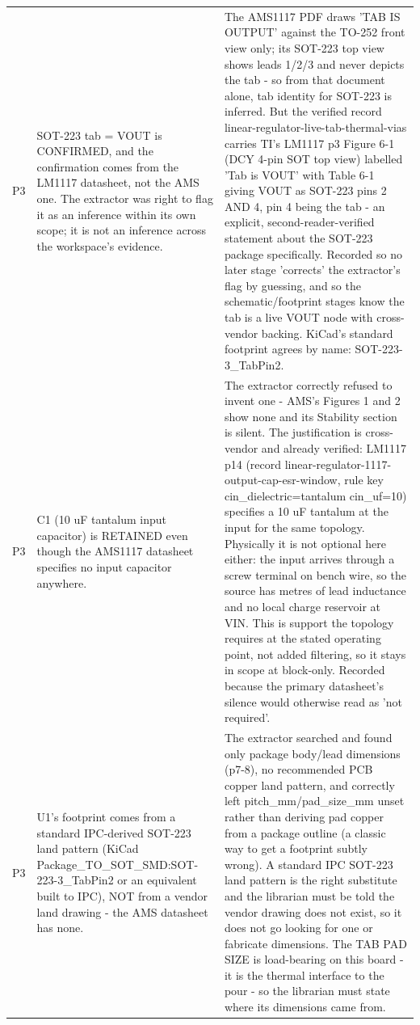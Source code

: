 \documentclass[11pt,a4paper]{article}
\begin{document}
{\begin{longtable}{lp{5.2cm}p{7.2cm}}
P3 & SOT-223 tab = VOUT is CONFIRMED, and the confirmation comes from the LM1117 datasheet, not the AMS one. The extractor was right to flag it as an inference within its own scope; it is not an inference across the workspace's evidence. & The AMS1117 PDF draws 'TAB IS OUTPUT' against the TO-252 front view only; its SOT-223 top view shows leads 1/2/3 and never depicts the tab - so from that document alone, tab identity for SOT-223 is inferred. But the verified record linear-regulator-live-tab-thermal-vias carries TI's LM1117 p3 Figure 6-1 (DCY 4-pin SOT top view) labelled 'Tab is VOUT' with Table 6-1 giving VOUT as SOT-223 pins 2 AND 4, pin 4 being the tab - an explicit, second-reader-verified statement about the SOT-223 package specifically. Recorded so no later stage 'corrects' the extractor's flag by guessing, and so the schematic/footprint stages know the tab is a live VOUT node with cross-vendor backing. KiCad's standard footprint agrees by name: SOT-223-3\_TabPin2. \\
P3 & C1 (10 uF tantalum input capacitor) is RETAINED even though the AMS1117 datasheet specifies no input capacitor anywhere. & The extractor correctly refused to invent one - AMS's Figures 1 and 2 show none and its Stability section is silent. The justification is cross-vendor and already verified: LM1117 p14 (record linear-regulator-1117-output-cap-esr-window, rule key cin\_dielectric=tantalum cin\_uf=10) specifies a 10 uF tantalum at the input for the same topology. Physically it is not optional here either: the input arrives through a screw terminal on bench wire, so the source has metres of lead inductance and no local charge reservoir at VIN. This is support the topology requires at the stated operating point, not added filtering, so it stays in scope at block-only. Recorded because the primary datasheet's silence would otherwise read as 'not required'. \\
P3 & U1's footprint comes from a standard IPC-derived SOT-223 land pattern (KiCad Package\_TO\_SOT\_SMD:SOT-223-3\_TabPin2 or an equivalent built to IPC), NOT from a vendor land drawing - the AMS datasheet has none. & The extractor searched and found only package body/lead dimensions (p7-8), no recommended PCB copper land pattern, and correctly left pitch\_mm/pad\_size\_mm unset rather than deriving pad copper from a package outline (a classic way to get a footprint subtly wrong). A standard IPC SOT-223 land pattern is the right substitute and the librarian must be told the vendor drawing does not exist, so it does not go looking for one or fabricate dimensions. The TAB PAD SIZE is load-bearing on this board - it is the thermal interface to the pour - so the librarian must state where its dimensions came from. \\

\end{longtable}}
\end{document}
